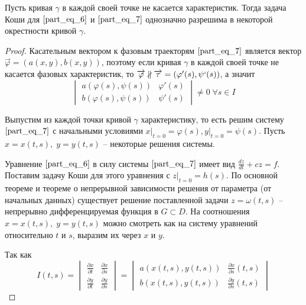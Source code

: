 \documentclass[a4paper, 12pt]{article}
\begin{document}
    \begin{theorem}
        Пусть кривая $\gamma$ в каждой своей точке не касается характеристик. Тогда задача Коши для $\eqref{part_eq_6}$ и $\eqref{part_eq_7}$ однозначно разрешима в некоторой окрестности кривой $\gamma$.
    \end{theorem}
    \begin{proof}
        Касательным вектором к фазовым траекторям $\eqref{part_eq_7}$ является вектор $\overrightarrow{\varphi} = \left( a(x, y), b(x, y) \right)$, поэтому если кривая $\gamma$ в каждой своей точке не касается фазовых характеристик, то $\overrightarrow{\varphi} \nparallel \overrightarrow{\tau} = (\varphi'(s), \psi`(s))$, а значит
        \begin{equation}
            \begin{vmatrix}
                a(\varphi(s), \psi(s)) & \varphi'(s) \\
                b(\varphi(s), \psi(s)) & \psi'(s)
            \end{vmatrix} \neq 0\; \forall s \in I
            \label{part_eq_8}
        \end{equation}
        
        Выпустим из каждой точки кривой $\gamma$ характеристику, то есть решим систему $\eqref{part_eq_7}$ с начальными условиями $x \big|_{t = 0} = \varphi(s), y \big|_{t = 0} = \psi(s)$. Пусть $x = x(t, s), \; y = y(t, s)$ -- некоторые решения системы.

        Уравнение $\eqref{part_eq_6}$ в силу системы $\eqref{part_eq_7}$ имеет вид $\frac{dz}{dt} + cz = f$. Поставим задачу Коши для этого уравнения с $z \big|_{t = 0} = h(s)$. По основной теореме и теореме о непрерывной зависимости решения от параметра (от начальных данных) существует решение поставленной задачи $z = \omega (t, s)$ -- непрерывно дифференцируемая функция в $G \subset D$. На соотношения $x = x(t, s), \; y = y(t, s)$ можно смотреть как на систему уравнений относительно $t$ и $s$, выразим их через $x$ и $y$.

        Так как
        \begin{equation*}
            I(t, s) =
            \begin{vmatrix}
                \frac{\partial x}{\partial t} & \frac{\partial x}{\partial s} \\
                \frac{\partial y}{\partial t} & \frac{\partial y}{\partial s}
            \end{vmatrix} =
            \begin{vmatrix}
                a(x(t, s), y(t, s)) & \frac{\partial x}{\partial s}(t, s) \\
                b(x(t, s), y(t, s)) & \frac{\partial y}{\partial s}(t, s)
            \end{vmatrix}
        \end{equation*}


\end{proof}
\end{document}
